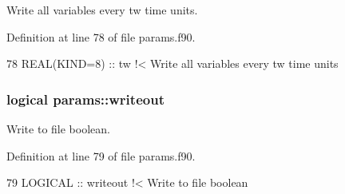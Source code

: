 Write all variables every tw time units. 



Definition at line 78 of file params.\+f90.


\begin{DoxyCode}
78   \textcolor{keywordtype}{REAL(KIND=8)} :: tw\textcolor{comment}{        !< Write all variables every tw time units}
\end{DoxyCode}
\subsubsection[{\texorpdfstring{writeout}{writeout}}]{\setlength{\rightskip}{0pt plus 5cm}logical params\+::writeout}\hypertarget{namespaceparams_affc7b423a975c0e92b62e67ed04edea5}{}\label{namespaceparams_affc7b423a975c0e92b62e67ed04edea5}


Write to file boolean. 



Definition at line 79 of file params.\+f90.


\begin{DoxyCode}
79   \textcolor{keywordtype}{LOGICAL} :: writeout\textcolor{comment}{       !< Write to file boolean}
\end{DoxyCode}
